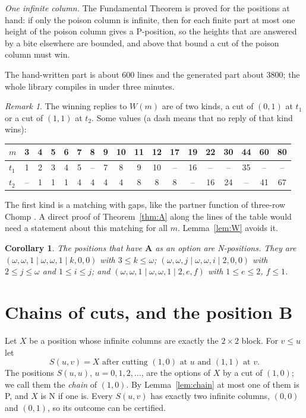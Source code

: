 \documentclass[11pt]{amsart}
\newtheorem{corollary}[theorem]{Corollary}
\theoremstyle{definition}
\theoremstyle{remark}
\newtheorem{remark}[theorem]{Remark}
\newcommand{\w}{\omega}
\newcommand{\PA}{\mathbf{A}}
\newcommand{\PB}{\mathbf{B}}
\begin{document}
\emph{One infinite column.} The Fundamental Theorem is proved for the positions at hand: if
only the poison column is infinite, then for each finite part at most one height of the
poison column gives a P-position, so the heights that are answered by a bite elsewhere are
bounded, and above that bound a cut of the poison column must win.

The hand-written part is about $600$ lines and the generated part about $3800$; the whole
library compiles in under three minutes.

\begin{remark}\label{rem:W}
The winning replies to $W(m)$ are of two kinds, a cut of $(0,1)$ at $t_1$ or a cut of $(1,1)$
at $t_2$. Some values (a dash means that no reply of that kind wins):
\begin{center}
\small\setlength{\tabcolsep}{4pt}
\begin{tabular}{l*{17}{c}}
\toprule
$m$ & 3 & 4 & 5 & 6 & 7 & 8 & 9 & 10 & 11 & 12 & 17 & 19 & 22 & 30 & 44 & 60 & 80\\
\midrule
$t_1$ & 1 & 2 & 3 & 4 & 5 & -- & 7 & 8 & 9 & 10 & -- & 16 & -- & -- & 35 & -- & --\\
$t_2$ & -- & 1 & 1 & 1 & 4 & 4 & 4 & 4 & 8 & 8 & 8 & -- & 16 & 24 & -- & 41 & 67\\
\bottomrule
\end{tabular}
\end{center}
The first kind is a matching with
gaps, like the partner function of three-row Chomp \cite{BHMS,Z}. A direct proof of
Theorem~\ref{thm:A} along the lines of the table would need a statement about this matching
for all $m$. Lemma~\ref{lem:W} avoids it.
\end{remark}

\begin{corollary}
The positions that have $\PA$ as an option are N-positions. They are
$(\w,\w,1\mid\w,\w,1\mid k,0,0)$ with $3\le k\le\w$; $(\w,\w,j\mid\w,\w,i\mid2,0,0)$ with
$2\le j\le\w$ and $1\le i\le j$; and $(\w,\w,1\mid\w,\w,1\mid2,e,f)$ with $1\le e\le2$,
$f\le1$.
\end{corollary}

\section{Chains of cuts, and the position \texorpdfstring{$\PB$}{B}}\label{sec:chains}

Let $X$ be a position whose infinite columns are exactly the $2\times2$ block. For $v\le u$ let
\[
S(u,v)=X\text{ after cutting }(1,0)\text{ at }u\text{ and }(1,1)\text{ at }v .
\]
The positions $S(u,u)$, $u=0,1,2,\dots$, are the options of $X$ by a cut of $(1,0)$; we call
them the \emph{chain} of $(1,0)$. By Lemma~\ref{lem:chain} at most one of them is P, and $X$ is
N if one is. Every $S(u,v)$ has exactly two infinite columns, $(0,0)$ and $(0,1)$, so its
outcome can be certified.
\end{document}
